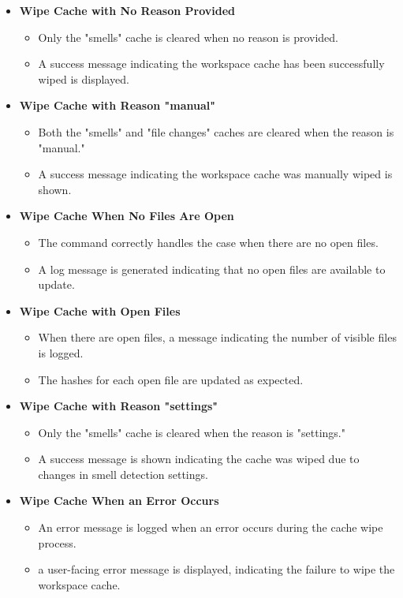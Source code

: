\documentclass[12pt, titlepage]{article}
\begin{document}
  \begin{itemize}
    \item \textbf{Wipe Cache with No Reason Provided}
      \begin{itemize}
        \item Only the "smells" cache is cleared when no reason is provided.
        \item A success message indicating the workspace cache has
          been successfully wiped is displayed.
      \end{itemize}

    \item \textbf{Wipe Cache with Reason "manual"}
      \begin{itemize}
        \item Both the "smells" and "file changes" caches are cleared
          when the reason is "manual."
        \item A success message indicating the workspace cache was
          manually wiped is shown.
      \end{itemize}

    \item \textbf{Wipe Cache When No Files Are Open}
      \begin{itemize}
        \item The command correctly handles the case when there are
          no open files.
        \item A log message is generated indicating that no open
          files are available to update.
      \end{itemize}

    \item \textbf{Wipe Cache with Open Files}
      \begin{itemize}
        \item When there are open files, a message indicating the
          number of visible files is logged.
        \item The hashes for each open file are updated as expected.
      \end{itemize}

    \item \textbf{Wipe Cache with Reason "settings"}
      \begin{itemize}
        \item Only the "smells" cache is cleared when the reason is "settings."
        \item A success message is shown indicating the cache was
          wiped due to changes in smell detection settings.
      \end{itemize}

    \item \textbf{Wipe Cache When an Error Occurs}
      \begin{itemize}
        \item An error message is logged when an error occurs during
          the cache wipe process.
        \item a user-facing error message is displayed, indicating
          the failure to wipe the workspace cache.
      \end{itemize}
  \end{itemize}
\end{document}
